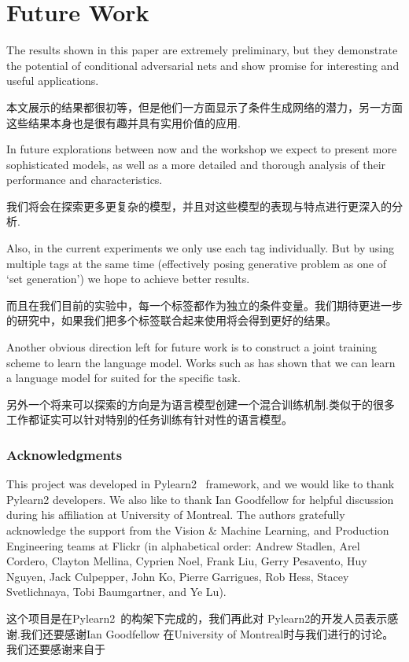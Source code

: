 \documentclass{article} %
\begin{document}
\section{Future Work}
The results shown in this paper are extremely preliminary, but they demonstrate the potential of
conditional adversarial nets and show promise for interesting and useful applications.

本文展示的结果都很初等，但是他们一方面显示了条件生成网络的潜力，另一方面这些结果本身也是很有趣并具有实用价值的应用.

In future explorations between now and the workshop we expect to present more sophisticated models,
as well as a more detailed and thorough analysis of their performance and characteristics.

我们将会在探索更多更复杂的模型，并且对这些模型的表现与特点进行更深入的分析.


Also, in the current experiments we only use each tag individually.
But by using multiple tags at the same time (effectively posing generative problem as one of `set generation')
we hope to achieve better results.

而且在我们目前的实验中，每一个标签都作为独立的条件变量。我们期待更进一步的研究中，如果我们把多个标签联合起来使用将会得到更好的结果。

Another obvious direction left for future work is to construct a joint training scheme to learn the language model. Works such as
\cite{kiros2013multimodal} has shown that we can learn a language model for suited for the specific task.

另外一个将来可以探索的方向是为语言模型创建一个混合训练机制.类似于\cite{kiros2013multimodal}的很多工作都证实可以针对特别的任务训练有针对性的语言模型。

\subsubsection*{Acknowledgments}
This project was developed in
Pylearn2~\citep{goodfellow2013pylearn2} framework, and we would like to thank Pylearn2 developers. 
We also like to thank Ian Goodfellow for helpful discussion during his affiliation at University of Montreal.
The authors gratefully acknowledge the support from the Vision \& Machine Learning, and Production
Engineering teams at Flickr (in alphabetical order: Andrew Stadlen, Arel Cordero, Clayton Mellina,
Cyprien Noel, Frank Liu, Gerry Pesavento, Huy Nguyen, Jack Culpepper, John Ko, Pierre Garrigues,
Rob Hess, Stacey Svetlichnaya, Tobi Baumgartner, and Ye Lu).

这个项目是在Pylearn2~\citep{goodfellow2013pylearn2}的构架下完成的，我们再此对 Pylearn2的开发人员表示感谢.我们还要感谢Ian Goodfellow 在University of Montreal时与我们进行的讨论。我们还要感谢来自于

\small{

}
\end{document}
